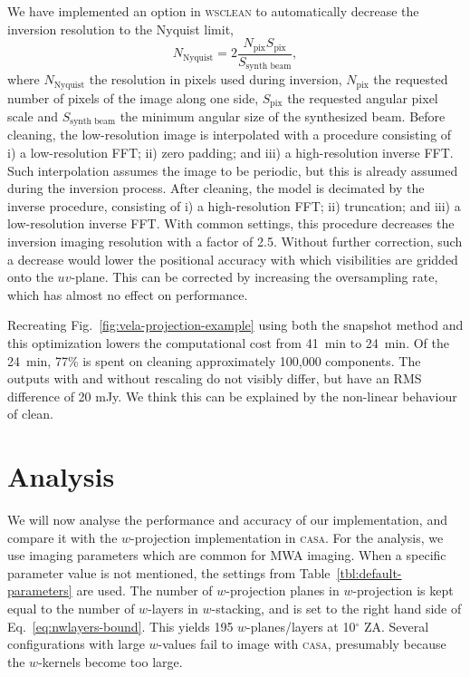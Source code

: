 \documentclass[useAMS,usenatbib]{mn2e}
\newcommand{\degree}{\ensuremath{^{\circ}}\xspace}
\begin{document}
We have implemented an option in \textsc{wsclean} to automatically decrease the inversion resolution to the Nyquist limit,
\begin{equation}\label{eq:nyquist-resolution}
 N_\textrm{Nyquist} = 2 \frac{N_\textrm{pix} S_\textrm{pix}}{S_\textrm{synth beam}},
\end{equation}
where $N_\textrm{Nyquist}$ the resolution in pixels used during inversion, $N_\textrm{pix}$ the requested number of pixels of the image along one side, $S_\textrm{pix}$ the requested angular pixel scale and $S_\textrm{synth beam}$ the minimum angular size of the synthesized beam. Before cleaning, the low-resolution image is interpolated with a procedure consisting of i) a low-resolution FFT; ii) zero padding; and iii) a high-resolution inverse FFT. Such interpolation assumes the image to be periodic, but this is already assumed during the inversion process. After cleaning, the model is decimated by the inverse procedure, consisting of i) a high-resolution FFT; ii) truncation; and iii) a low-resolution inverse FFT. With common settings, this procedure decreases the inversion imaging resolution with a factor of 2.5. Without further correction, such a decrease would lower the positional accuracy with which visibilities are gridded onto the $uv$-plane. This can be corrected by increasing the oversampling rate, which has almost no effect on performance.

Recreating Fig.~\ref{fig:vela-projection-example} using both the snapshot method and this optimization lowers the computational cost from 41~min to 24~min. Of the 24~min, 77\% is spent on cleaning approximately 100,000 components. The outputs with and without rescaling do not visibly differ, but have an RMS difference of 20 mJy. We think this can be explained by the non-linear behaviour of clean.

\section{Analysis} \label{sec:analysis}
We will now analyse the performance and accuracy of our implementation, and compare it with the $w$-projection implementation in \textsc{casa}. For the analysis, we use imaging parameters which are common for MWA imaging. When a specific parameter value is not mentioned, the settings from Table~\ref{tbl:default-parameters} are used. The number of $w$-projection planes in $w$-projection is kept equal to the number of $w$-layers in $w$-stacking, and is set to the right hand side of Eq.~\eqref{eq:nwlayers-bound}. This yields 195 $w$-planes/layers at 10\degree ZA. Several configurations with large $w$-values fail to image with \textsc{casa}, presumably because the $w$-kernels become too large.
\end{document}
